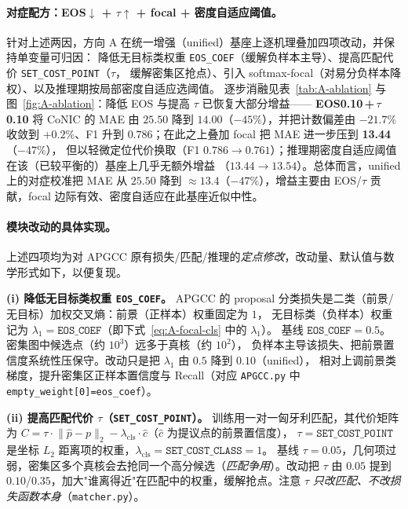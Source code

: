 \paragraph{对症配方：EOS$\downarrow$ + $\tau\uparrow$ + focal + 密度自适应阈值。}
针对上述两因，方向 A 在统一增强（unified）基座上逐机理叠加四项改动，并保持单变量可归因：
降低无目标类权重 \texttt{EOS\_COEF}（缓解负样本主导）、提高匹配代价 \texttt{SET\_COST\_POINT}（$\tau$，
缓解密集区抢点）、引入 softmax-focal（对易分负样本降权）、以及推理期按局部密度自适应选阈值。
逐步消融见表~\ref{tab:A-ablation} 与图~\ref{fig:A-ablation}：降低 EOS 与提高 $\tau$ 已恢复大部分增益——
\textbf{EOS0.10\,+\,$\tau$0.10} 将 CoNIC 的 MAE 由 $25.50$ 降到 $14.00$（$-45\%$），并把计数偏差由
$-21.7\%$ 收敛到 $+0.2\%$、F1 升到 $0.786$；在此之上叠加 focal 把 MAE 进一步压到 \textbf{13.44}（$-47\%$），
但以轻微定位代价换取（F1 $0.786\!\to\!0.761$）；推理期密度自适应阈值在该（已较平衡的）基座上几乎无额外增益
（$13.44\!\to\!13.54$）。总体而言，unified 上的对症校准把 MAE 从 $25.50$ 降到 $\approx13.4$（$-47\%$），增益主要由
EOS/$\tau$ 贡献，focal 边际有效、密度自适应在此基座近似中性。

\paragraph{模块改动的具体实现。}
上述四项均为对 APGCC 原有损失/匹配/推理的\emph{定点修改}，改动量、默认值与数学形式如下，以便复现。

\textbf{(i) 降低无目标类权重 \texttt{EOS\_COEF}。}
APGCC 的 proposal 分类损失是二类（前景/无目标）加权交叉熵：前景（正样本）权重固定为 $1$，
无目标类（负样本）权重记为 $\lambda_1{=}\texttt{EOS\_COEF}$（即下式~\eqref{eq:A-focal-cls} 中的 $\lambda_1$）。
基线 $\texttt{EOS\_COEF}{=}0.5$。密集图中候选点（约 $10^3$）远多于真核（约 $10^2$），
负样本主导该损失、把前景置信度系统性压保守。改动只是把 $\lambda_1$ 由 $0.5$ 降到 $0.10$（unified），
相对上调前景类梯度，提升密集区正样本置信度与 Recall（对应 \texttt{APGCC.py} 中 \texttt{empty\_weight[0]=eos\_coef}）。

\textbf{(ii) 提高匹配代价 $\tau$（\texttt{SET\_COST\_POINT}）。}
训练用一对一匈牙利匹配，其代价矩阵为
$C=\tau\cdot\lVert \hat{p}-p\rVert_{2}-\lambda_{\text{cls}}\cdot\hat{c}$（$\hat{c}$ 为提议点的前景置信度），
$\tau{=}\texttt{SET\_COST\_POINT}$ 是坐标 $L_2$ 距离项的权重，$\lambda_{\text{cls}}{=}\texttt{SET\_COST\_CLASS}{=}1$。
基线 $\tau{=}0.05$，几何项过弱，密集区多个真核会去抢同一个高分候选（\emph{匹配争用}）。改动把 $\tau$ 由 $0.05$ 提到
$0.10$/$0.35$，加大"谁离得近"在匹配中的权重，缓解抢点。注意 $\tau$ \emph{只改匹配、不改损失函数本身}（\texttt{matcher.py}）。

